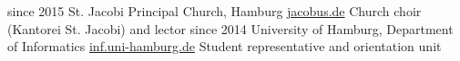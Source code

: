 \documentclass[]{friggeri-cv}
\begin{document}
  \begin{entrylist}
    \entry
      {since 2015}
      {St. Jacobi Principal Church, Hamburg}
      {\href{http://www.jacobus.de}{jacobus.de}}
      {Church choir (Kantorei St. Jacobi) and lector}
    \entry
      {since 2014}
      {University of Hamburg, Department of Informatics}
      {\href{https://www.inf.uni-hamburg.de/en.html}{inf.uni-hamburg.de}}
      {Student representative and orientation unit}
  \end{entrylist}
%

%
\end{document}
